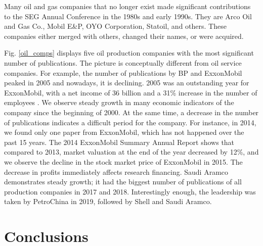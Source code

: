 \documentclass[energies,article,submit,moreauthors,pdftex]{Definitions/mdpi}
\begin{document}
Many oil and gas companies that no longer exist made significant contributions to the SEG Annual Conference in the 1980s and early 1990s. They are Arco Oil and Gas Co., Mobil E\&P, OYO Corporation, Statoil, and others. These companies either merged with others, changed their names, or were acquired.

Fig. \ref{oil_comps} displays five oil production companies with the most significant number of publications. The picture is conceptually different from oil service companies. For example, the number of publications by BP and ExxonMobil peaked in 2005 and nowadays, it is declining. 2005 was an outstanding year for ExxonMobil, with a net income of 36 billion and a 31\% increase in the number of employees \citep{ExxonMobil2005}. We observe steady growth in many economic indicators of the company since the beginning of 2000. At the same time, a decrease in the number of publications indicates a difficult period for the company. For instance, in 2014, we found only one paper from ExxonMobil, which has not happened over the past 15 years. The 2014 ExxonMobil Summary Annual Report \citep{ExxonMobil2014} shows that compared to 2013, market valuation at the end of the year decreased by 12\%, and we observe the decline in the stock market price of ExxonMobil in 2015. The decrease in profits immediately affects research financing. Saudi Aramco demonstrates steady growth; it had the biggest number of publications of all production companies in 2017 and 2018. Interestingly enough, the leadership was taken by PetroChina in 2019, followed by Shell and Saudi Aramco.


%


\section{Conclusions}
\end{document}
